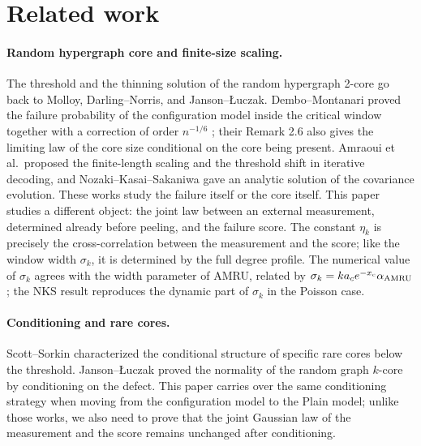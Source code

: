 \section{Related work}\label{sec:related}
\paragraph{Random hypergraph core and finite-size scaling.} The threshold and the thinning solution of the random hypergraph 2-core
go back to Molloy\cite{molloy}, Darling--Norris\cite{dn}, and Janson--Łuczak\cite{jl07}. Dembo--Montanari
proved the failure probability of the configuration model inside the critical window together with a correction of order $n^{-1/6}$
\cite{dm}; their Remark 2.6 also gives the limiting law of the core size conditional on the core being present. Amraoui
et al.\ proposed the finite-length scaling and the threshold shift in iterative decoding\cite{amru}, and Nozaki--Kasai--Sakaniwa gave
an analytic solution of the covariance evolution\cite{nks}. These works study the failure itself or the core itself.
This paper studies a different object: the joint law between an external measurement, determined already before peeling,
and the failure score. The constant $\eta_k$
is precisely the cross-correlation between the measurement and the score; like the window width $\sigma_k$, it is determined by the full degree profile.
The numerical value of $\sigma_k$ agrees with the width parameter of AMRU, related by
$\sigma_k=ka_ce^{-x_c}\alpha_{\rm AMRU}$; the NKS result reproduces the dynamic part of $\sigma_k$ in the Poisson case.

\paragraph{Conditioning and rare cores.} Scott--Sorkin characterized the conditional structure of specific rare cores
below the threshold\cite{ss}. Janson--Łuczak proved the normality of the random graph $k$-core by conditioning on the defect\cite{jl}.
This paper carries over the same conditioning strategy when moving from the configuration model to the Plain model; unlike those works,
we also need to prove that the joint Gaussian law of the measurement
and the score remains unchanged after conditioning.

